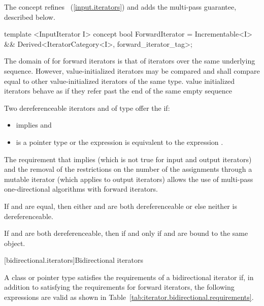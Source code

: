 \begin{addedblock}
\pnum
The  concept refines ~(\ref{input.iterators})
and adds the multi-pass guarantee, described below.

\begin{codeblock}
template <InputIterator I>
concept bool ForwardIterator =
  Incrementable<I> &&
  Derived<IteratorCategory<I>, forward_iterator_tag>;
\end{codeblock}
\end{addedblock}

\pnum
The domain of \tcode{==} for forward iterators is that of iterators over the same
underlying sequence. However, value-initialized iterators may be compared and
shall compare equal to other value-initialized iterators of the same type.
\enternote value initialized iterators behave as if they refer past the end of
the same empty sequence \exitnote

\pnum
Two dereferenceable iterators  and  of type  offer the
 if:

\begin{itemize}
\item {} implies  and
\item {} is a pointer type or the expression
 is equivalent to the expression .
\end{itemize}

\pnum
\enternote
The requirement that
implies
(which is not true for input and output iterators)
and the removal of the restrictions on the number of the assignments through
a mutable iterator
(which applies to output iterators)
allows the use of multi-pass one-directional algorithms with forward iterators.
\exitnote


\pnum
If  and  are equal, then either  and 
are both dereferenceable
or else neither is dereferenceable.

\pnum
If  and  are both dereferenceable, then 
if and only if
 and  are bound to the same object.

[bidirectional.iterators]{Bidirectional iterators}

\begin{removedblock}
\pnum
A class or pointer type
satisfies the requirements of a bidirectional iterator if,
in addition to satisfying the requirements for forward iterators,
the following expressions are valid as shown in Table~\ref{tab:iterator.bidirectional.requirements}.
\end{removedblock}


